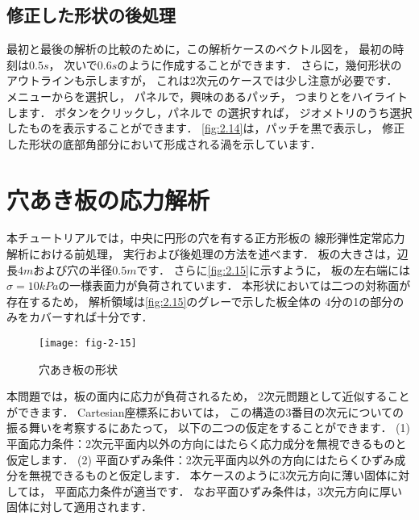 \subsection{修正した形状の後処理}
\label{ssec:2.1.10}
最初と最後の解析の比較のために，この解析ケースのベクトル図を，
最初の時刻は$0.5\unit{s}$，
次いで$0.6\unit{s}$のように作成することができます．
さらに，幾何形状のアウトラインも示しますが，
これは2次元のケースでは少し注意が必要です．
メニューからを選択し，
パネルで，興味のあるパッチ，
つまりとをハイライトします．
ボタンをクリックし，パネルで
の選択すれば，
ジオメトリのうち選択したものを表示することができます．
\autoref{fig:2.14}は，パッチを黒で表示し，
修正した形状の底部角部分において形成される渦を示しています．



\section{穴あき板の応力解析}
\label{sec:2.2}
%
%
本チュートリアルでは，中央に円形の穴を有する正方形板の
線形弾性定常応力解析における前処理，
実行および後処理の方法を述べます．
板の大きさは，辺長$4\unit{m}$および穴の半径$0.5\unit{m}$です．
さらに\autoref{fig:2.15}に示すように，
板の左右端には$\sigma = 10\unit{kPa}$の一様表面力が負荷されています．
本形状においては二つの対称面が存在するため，
解析領域は\autoref{fig:2.15}のグレーで示した板全体の
4分の1の部分のみをカバーすれば十分です．


\begin{figure}[ht]
 \texttt{[image: fig-2-15]}
 \caption{穴あき板の形状}
 \label{fig:2.15}
\end{figure}


本問題では，板の面内に応力が負荷されるため，
2次元問題として近似することができます．
Cartesian座標系においては，
この構造の3番目の次元についての振る舞いを考察するにあたって，
以下の二つの仮定をすることができます．
(1) 平面応力条件：2次元平面内以外の方向にはたらく応力成分を無視できるものと仮定します．
(2) 平面ひずみ条件：2次元平面内以外の方向にはたらくひずみ成分を無視できるものと仮定します．
本ケースのように3次元方向に薄い固体に対しては，
平面応力条件が適当です．
なお平面ひずみ条件は，3次元方向に厚い固体に対して適用されます．

